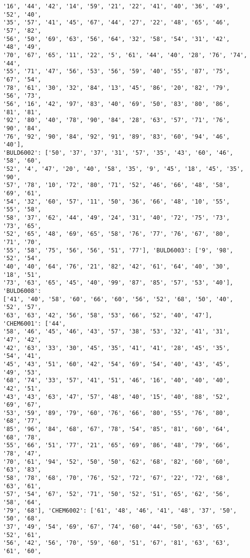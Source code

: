 \documentclass[11pt]{article}
\begin{document}
\begin{Verbatim}[commandchars=\\\{\}]
'16', '44', '42', '14', '59', '21', '22', '41', '40', '36', '49', '52', '40',
'35', '57', '41', '45', '67', '44', '27', '22', '48', '65', '46', '57', '82',
'56', '50', '69', '63', '56', '64', '32', '58', '54', '31', '42', '48', '49',
'70', '67', '65', '11', '22', '5', '61', '44', '40', '28', '76', '74', '44',
'55', '71', '47', '56', '53', '56', '59', '40', '55', '87', '75', '67', '54',
'78', '61', '30', '32', '84', '13', '45', '86', '20', '82', '79', '56', '73',
'56', '16', '42', '97', '83', '40', '69', '50', '83', '80', '86', '81', '81',
'92', '80', '40', '78', '90', '84', '28', '63', '57', '71', '76', '90', '84',
'76', '92', '90', '84', '92', '91', '89', '83', '60', '94', '46', '40'],
'BULD6002': ['50', '37', '37', '31', '57', '35', '43', '60', '46', '58', '60',
'52', '4', '47', '20', '40', '58', '35', '9', '45', '18', '45', '35', '90',
'57', '78', '10', '72', '80', '71', '52', '46', '66', '48', '58', '69', '61',
'54', '32', '60', '57', '11', '50', '36', '66', '48', '10', '55', '55', '58',
'58', '37', '62', '44', '49', '24', '31', '40', '72', '75', '73', '73', '65',
'52', '65', '48', '69', '65', '58', '76', '77', '76', '67', '80', '71', '70',
'55', '58', '75', '56', '56', '51', '77'], 'BULD6003': ['9', '98', '52', '54',
'40', '40', '64', '76', '21', '82', '42', '61', '64', '40', '30', '18', '51',
'73', '63', '65', '45', '40', '99', '87', '85', '57', '53', '40'], 'BULD6008':
['41', '40', '58', '60', '66', '60', '56', '52', '68', '50', '40', '52', '57',
'63', '63', '42', '56', '58', '53', '66', '52', '40', '47'], 'CHEM6001': ['44',
'58', '46', '45', '46', '43', '57', '38', '53', '32', '41', '31', '47', '42',
'42', '63', '33', '30', '45', '35', '41', '41', '28', '45', '35', '54', '41',
'45', '43', '51', '60', '42', '54', '69', '54', '40', '43', '45', '49', '53',
'68', '74', '33', '57', '41', '51', '46', '16', '40', '40', '40', '42', '51',
'43', '43', '63', '47', '57', '48', '40', '15', '40', '88', '52', '69', '67',
'53', '59', '89', '79', '60', '76', '66', '80', '55', '76', '80', '68', '77',
'85', '96', '84', '68', '67', '78', '54', '85', '81', '60', '64', '68', '78',
'55', '66', '51', '77', '21', '65', '69', '86', '48', '79', '66', '78', '47',
'70', '61', '94', '52', '50', '50', '62', '68', '82', '60', '60', '63', '83',
'58', '78', '68', '70', '76', '52', '72', '67', '22', '72', '68', '63', '61',
'57', '54', '67', '52', '71', '50', '52', '51', '65', '62', '56', '58', '64',
'79', '68'], 'CHEM6002': ['61', '48', '46', '41', '48', '37', '50', '50', '68',
'37', '49', '54', '69', '67', '74', '60', '44', '50', '63', '65', '52', '61',
'56', '42', '56', '70', '59', '60', '51', '67', '81', '63', '63', '61', '60',

\end{Verbatim}
\end{document}

